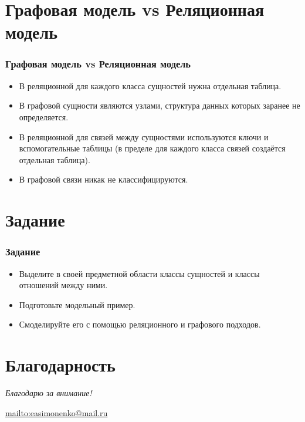 \documentclass[11pt]{beamer}
\begin{document}
\section{Графовая модель vs Реляционная модель}

\begin{frame}
  \frametitle{Графовая модель vs Реляционная модель}
  \begin{itemize}
  \item В реляционной для каждого класса сущностей нужна отдельная таблица.
  \item В графовой сущности являются узлами, структура данных которых заранее не определяется.
  \item В реляционной для связей между сущностями используются ключи и вспомогательные таблицы
    (в пределе для каждого класса связей создаётся отдельная таблица).
  \item В графовой связи никак не классифицируются.
  \end{itemize}
\end{frame}

\section{Задание}

\begin{frame}
  \frametitle{Задание}
  \begin{itemize}
  \item Выделите в своей предметной области классы сущностей и классы отношений между ними.
  \item Подготовьте модельный пример.
  \item Смоделируйте его с помощью реляционного и графового подходов.
  \end{itemize}
\end{frame}

\section*{Благодарность}

\begin{frame}
  \center
  \textit{Благодарю за внимание!}
  
  \textbf{\textsl{\inserttitle}}

  \insertauthor

  \url{mailto:easimonenko@mail.ru}

  \insertinstitute
\end{frame}
\end{document}
